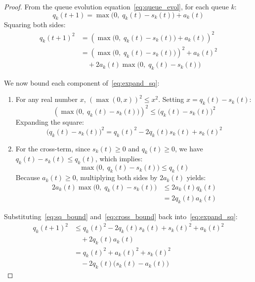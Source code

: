 \documentclass[conference]{IEEEtran}
\begin{document}
\begin{proof}
From the queue evolution equation~\eqref{eq:queue_evol}, for each queue $k$:
\begin{equation}
q_k(t+1) = \max\Big(0, \; q_k(t) - s_k(t)\Big) + a_k(t)
\end{equation}
Squaring both sides:
\begin{align}
\label{eq:expand_sq}
q_k(t+1)^2 &= \left( \max\Big(0, \; q_k(t) - s_k(t)\Big) + a_k(t) \right)^2 \nonumber \\
&= \left(\max\Big(0, \; q_k(t) - s_k(t)\Big)\right)^2 + a_k(t)^2 \nonumber \\
&\quad + 2 a_k(t) \max\Big(0, \; q_k(t) - s_k(t)\Big)
\end{align}

We now bound each component of~\eqref{eq:expand_sq}:
\begin{enumerate}
    \item For any real number $x$, $(\max(0, x))^2 \le x^2$. Setting $x = q_k(t) - s_k(t)$:
    \begin{equation}
    \label{eq:sq_bound}
    \left(\max\Big(0, \; q_k(t) - s_k(t)\Big)\right)^2 \le \big( q_k(t) - s_k(t) \big)^2
    \end{equation}
    Expanding the square:
    \begin{equation}
    \big( q_k(t) - s_k(t) \big)^2 = q_k(t)^2 - 2 q_k(t) s_k(t) + s_k(t)^2
    \end{equation}
    
    \item For the cross-term, since $s_k(t) \ge 0$ and $q_k(t) \ge 0$, we have $q_k(t) - s_k(t) \le q_k(t)$, which implies:
    \begin{equation}
    \max\Big(0, \; q_k(t) - s_k(t)\Big) \le q_k(t)
    \end{equation}
    Because $a_k(t) \ge 0$, multiplying both sides by $2 a_k(t)$ yields:
    \begin{align}
    \label{eq:cross_bound}
    2 a_k(t) \max\Big(0, \; q_k(t) - s_k(t)\Big) &\le 2 a_k(t) q_k(t) \nonumber \\
    &= 2 q_k(t) a_k(t)
    \end{align}
\end{enumerate}

Substituting~\eqref{eq:sq_bound} and~\eqref{eq:cross_bound} back into~\eqref{eq:expand_sq}:
\begin{align}
q_k(t+1)^2 &\le q_k(t)^2 - 2 q_k(t) s_k(t) + s_k(t)^2 + a_k(t)^2 \nonumber \\
&\quad + 2 q_k(t) a_k(t) \nonumber \\
&= q_k(t)^2 + a_k(t)^2 + s_k(t)^2 \nonumber \\
&\quad - 2 q_k(t) \big( s_k(t) - a_k(t) \big)
\end{align}


\end{proof}
\end{document}
